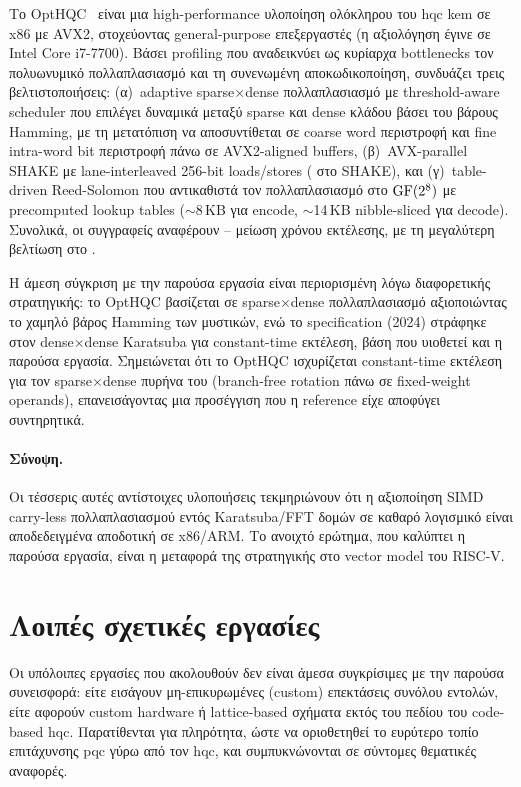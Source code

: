 Το OptHQC~\cite{OptHQC2025} είναι μια high-performance υλοποίηση ολόκληρου του
\gls{hqc} \gls{kem} σε x86 με AVX2, στοχεύοντας general-purpose επεξεργαστές
(η αξιολόγηση έγινε σε Intel Core i7-7700). Βάσει profiling που αναδεικνύει ως
κυρίαρχα bottlenecks τον πολυωνυμικό πολλαπλασιασμό και τη συνενωμένη
αποκωδικοποίηση, συνδυάζει τρεις βελτιστοποιήσεις: (α)~adaptive
sparse$\times$dense πολλαπλασιασμό με threshold-aware scheduler που επιλέγει
δυναμικά μεταξύ sparse και dense κλάδου βάσει του βάρους Hamming, με τη
μετατόπιση να αποσυντίθεται σε coarse word περιστροφή και fine intra-word bit
περιστροφή πάνω σε AVX2-aligned buffers, (β)~AVX-parallel SHAKE με
lane-interleaved 256-bit loads/stores ( στο SHAKE), και
(γ)~table-driven Reed-Solomon που αντικαθιστά τον πολλαπλασιασμό στο $\mathrm{GF}(2^8)$
με precomputed lookup tables ($\sim$8\,KB για encode, $\sim$14\,KB nibble-sliced
για decode). Συνολικά, οι συγγραφείς αναφέρουν – μείωση 
χρόνου εκτέλεσης, με τη μεγαλύτερη βελτίωση στο \Decaps.

Η άμεση σύγκριση με την παρούσα εργασία είναι περιορισμένη λόγω 
διαφορετικής στρατηγικής: το OptHQC βασίζεται σε
sparse$\times$dense πολλαπλασιασμό αξιοποιώντας το χαμηλό βάρος Hamming των
μυστικών, ενώ το specification (2024) στράφηκε στον dense$\times$dense Karatsuba
για constant-time εκτέλεση, βάση που υιοθετεί και η παρούσα
εργασία. Σημειώνεται ότι το OptHQC ισχυρίζεται constant-time εκτέλεση για τον
sparse$\times$dense πυρήνα του (branch-free rotation πάνω σε fixed-weight
operands), επανεισάγοντας μια προσέγγιση που η reference είχε αποφύγει
συντηρητικά.

\paragraph{Σύνοψη.} Οι τέσσερις αυτές αντίστοιχες υλοποιήσεις τεκμηριώνουν ότι η αξιοποίηση SIMD carry-less
πολλαπλασιασμού εντός Karatsuba/FFT δομών σε καθαρό λογισμικό είναι αποδεδειγμένα
αποδοτική σε x86/ARM. Το ανοιχτό ερώτημα, που καλύπτει η παρούσα εργασία, είναι η μεταφορά
της στρατηγικής στο vector model του RISC-V.

\section{Λοιπές σχετικές εργασίες}
\label{sec:rw-other}

Οι υπόλοιπες εργασίες που ακολουθούν δεν είναι άμεσα συγκρίσιμες με 
την παρούσα συνεισφορά: είτε εισάγουν μη-επικυρωμένες (custom)
επεκτάσεις συνόλου εντολών, είτε αφορούν custom hardware ή lattice-based σχήματα
εκτός του πεδίου του code-based \gls{hqc}. Παρατίθενται για πληρότητα, ώστε να
οριοθετηθεί το ευρύτερο τοπίο επιτάχυνσης \gls{pqc} γύρω από τον \gls{hqc}, και
συμπυκνώνονται σε σύντομες θεματικές αναφορές.

